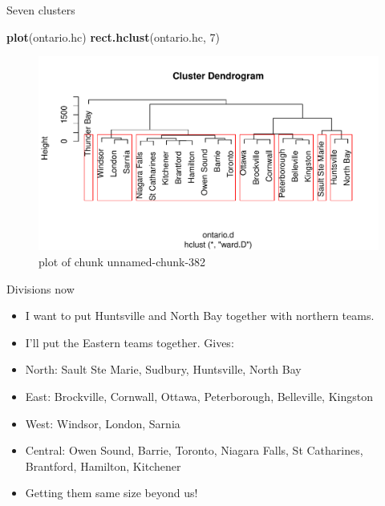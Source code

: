 \documentclass[ignorenonframetext,]{beamer}
\newenvironment{Shaded}{\begin{snugshade}}{\end{snugshade}}
\newcommand{\DecValTok}[1]{\textcolor[rgb]{0.00,0.00,0.81}{#1}}
\newcommand{\KeywordTok}[1]{\textcolor[rgb]{0.13,0.29,0.53}{\textbf{#1}}}
\newcommand{\NormalTok}[1]{#1}
\begin{document}
\begin{frame}[fragile]{Seven clusters}
\protect\hypertarget{seven-clusters}{}

\begin{Shaded}
\begin{Highlighting}[]
\KeywordTok{plot}\NormalTok{(ontario.hc)}
\KeywordTok{rect.hclust}\NormalTok{(ontario.hc, }\DecValTok{7}\NormalTok{)}
\end{Highlighting}
\end{Shaded}

\begin{figure}
\centering
\includegraphics{figure/unnamed-chunk-382-1.pdf}
\caption{plot of chunk unnamed-chunk-382}
\end{figure}

\end{frame}

\begin{frame}{Divisions now}
\protect\hypertarget{divisions-now}{}

\begin{itemize}
\item
  I want to put Huntsville and North Bay together with northern teams.
\item
  I'll put the Eastern teams together. Gives:
\item
  North: Sault Ste Marie, Sudbury, Huntsville, North Bay
\item
  East: Brockville, Cornwall, Ottawa, Peterborough, Belleville, Kingston
\item
  West: Windsor, London, Sarnia
\item
  Central: Owen Sound, Barrie, Toronto, Niagara Falls, St Catharines,
  Brantford, Hamilton, Kitchener
\item
  Getting them same size beyond us!
\end{itemize}

\end{frame}
\end{document}
